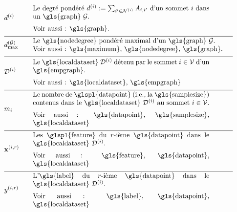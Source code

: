\begin{align}
	&\nodedegree{\nodeidx} & \quad & \parbox{.75\textwidth}{
	Le degré pondéré $\nodedegree{\nodeidx}\defeq \sum_{\nodeidx' \in \neighbourhood{\nodeidx}} \edgeweight_{\nodeidx,\nodeidx'}$ d’un sommet $\nodeidx$ dans un \gls{graph} $\graph$. \\
	[2mm] Voir aussi : \gls{graph}.
	} \nonumber \\[2mm] \hline \nonumber\\[-5mm]
	&\maxnodedegree^{(\graph)} & \quad & \parbox{.85\textwidth}{Le \gls{nodedegree} pondéré maximal d’un \gls{graph} $\graph$. 
		\\ Voir aussi : \gls{maximum}, \gls{nodedegree}, \gls{graph}. } \nonumber \\[2mm] \hline \nonumber\\[-5mm]
	&\localdataset{\nodeidx} & \quad & \parbox{.75\textwidth}{
		Le \gls{localdataset} $\localdataset{\nodeidx}$ détenu par le sommet $\nodeidx\in \nodes$ d’un \gls{empgraph}. \\
		[2mm] Voir aussi : \gls{localdataset}, \gls{empgraph}
	} \nonumber \\[2mm] \hline \nonumber\\[-5mm]
	&\localsamplesize{\nodeidx} & \quad & \parbox{.75\textwidth}{
		Le nombre de \glspl{datapoint} (i.e., la \gls{samplesize}) contenus dans le \gls{localdataset} $\localdataset{\nodeidx}$ au sommet $\nodeidx \in \nodes$. \\
		[2mm] Voir aussi : \gls{datapoint}, \gls{samplesize}, \gls{localdataset}
	} \nonumber \\[2mm] \hline \nonumber\\[-5mm]
	&\featurevec^{(\nodeidx,\sampleidx)} & \quad & \parbox{.75\textwidth}{
		Les \glspl{feature} du $\sampleidx$-ième \gls{datapoint} dans le \gls{localdataset} $\localdataset{\nodeidx}$. \\
		[2mm] Voir aussi : \gls{feature}, \gls{datapoint}, \gls{localdataset}
	} \nonumber \\[2mm] \hline \nonumber\\[-5mm]
	&\truelabel^{(\nodeidx,\sampleidx)} & \quad & \parbox{.75\textwidth}{
		L'\gls{label} du $\sampleidx$-ième \gls{datapoint} dans le \gls{localdataset} $\localdataset{\nodeidx}$. \\
		[2mm] Voir aussi : \gls{label}, \gls{datapoint}, \gls{localdataset}
	} \nonumber
\end{align}

